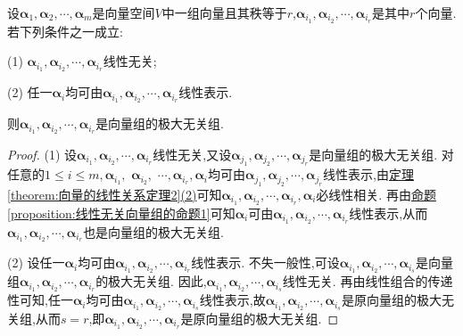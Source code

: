 \documentclass[../../main.tex]{subfiles}
\begin{document}
\begin{proposition}\label{proposition:极大无关组的判定条件}
设\(\boldsymbol{\alpha}_1,\boldsymbol{\alpha}_2,\cdots,\boldsymbol{\alpha}_m\)是向量空间\(V\)中一组向量且其秩等于\(r\),\(\boldsymbol{\alpha}_{i_1},\boldsymbol{\alpha}_{i_2},\cdots,\boldsymbol{\alpha}_{i_r}\)是其中\(r\)个向量. 若下列条件之一成立:

(1) \(\boldsymbol{\alpha}_{i_1},\boldsymbol{\alpha}_{i_2},\cdots,\boldsymbol{\alpha}_{i_r}\)线性无关;

(2) 任一\(\boldsymbol{\alpha}_i\)均可由\(\boldsymbol{\alpha}_{i_1},\boldsymbol{\alpha}_{i_2},\cdots,\boldsymbol{\alpha}_{i_r}\)线性表示.

则\(\boldsymbol{\alpha}_{i_1},\boldsymbol{\alpha}_{i_2},\cdots,\boldsymbol{\alpha}_{i_r}\)是向量组的极大无关组.
\end{proposition}
\begin{proof}
(1) 设\(\boldsymbol{\alpha}_{i_1},\boldsymbol{\alpha}_{i_2},\cdots,\boldsymbol{\alpha}_{i_r}\)线性无关,又设\(\boldsymbol{\alpha}_{j_1},\boldsymbol{\alpha}_{j_2},\cdots,\boldsymbol{\alpha}_{j_r}\)是向量组的极大无关组. 对任意的\(1\leqslant  i\leqslant  m,\)$\boldsymbol{\alpha}_{i_1},$ $\boldsymbol{\alpha}_{i_2},$ $\cdots,$$\boldsymbol{\alpha}_{i_r},$$\boldsymbol{\alpha}_i$均可由\(\boldsymbol{\alpha}_{j_1},\boldsymbol{\alpha}_{j_2},\cdots,\boldsymbol{\alpha}_{j_r}\)线性表示,由\hyperref[theorem:向量的线性关系定理2]{定理\ref{theorem:向量的线性关系定理2}(2)}可知\(\boldsymbol{\alpha}_{i_1},\boldsymbol{\alpha}_{i_2},\cdots,\boldsymbol{\alpha}_{i_r},\boldsymbol{\alpha}_i\)必线性相关. 再由\hyperref[proposition:线性无关向量组的命题1]{命题\ref{proposition:线性无关向量组的命题1}}可知\(\boldsymbol{\alpha}_i\)可由\(\boldsymbol{\alpha}_{i_1},\boldsymbol{\alpha}_{i_2},\cdots,\boldsymbol{\alpha}_{i_r}\)线性表示,从而\(\boldsymbol{\alpha}_{i_1},\boldsymbol{\alpha}_{i_2},\cdots,\boldsymbol{\alpha}_{i_r}\)也是向量组的极大无关组.

(2) 设任一\(\boldsymbol{\alpha}_i\)均可由\(\boldsymbol{\alpha}_{i_1},\boldsymbol{\alpha}_{i_2},\cdots,\boldsymbol{\alpha}_{i_r}\)线性表示. 不失一般性,可设\(\boldsymbol{\alpha}_{i_1},\boldsymbol{\alpha}_{i_2},\cdots,\boldsymbol{\alpha}_{i_s}\)是向量组\(\boldsymbol{\alpha}_{i_1},\boldsymbol{\alpha}_{i_2},\cdots,\boldsymbol{\alpha}_{i_r}\)的极大无关组. 因此,\(\boldsymbol{\alpha}_{i_1},\boldsymbol{\alpha}_{i_2},\cdots,\boldsymbol{\alpha}_{i_s}\)线性无关. 再由线性组合的传递性可知,任一\(\boldsymbol{\alpha}_i\)均可由\(\boldsymbol{\alpha}_{i_1},\boldsymbol{\alpha}_{i_2},\cdots,\boldsymbol{\alpha}_{i_s}\)线性表示,故\(\boldsymbol{\alpha}_{i_1},\boldsymbol{\alpha}_{i_2},\cdots,\boldsymbol{\alpha}_{i_s}\)是原向量组的极大无关组,从而\(s = r\),即\(\boldsymbol{\alpha}_{i_1},\boldsymbol{\alpha}_{i_2},\cdots,\boldsymbol{\alpha}_{i_r}\)是原向量组的极大无关组.
\end{proof}
\end{document}

